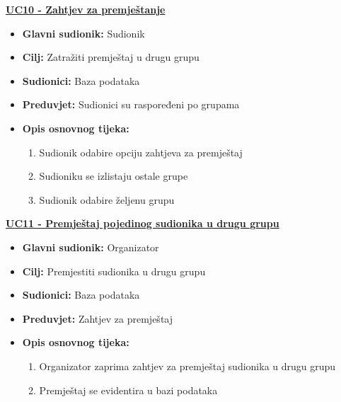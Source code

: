 \noindent \underline{\textbf{UC10 - Zahtjev za premještanje}}
\begin{itemize}
	\item \textbf{Glavni sudionik:} Sudionik
	\item \textbf{Cilj:} Zatražiti premještaj u drugu grupu
	\item \textbf{Sudionici:} Baza podataka
	\item \textbf{Preduvjet:} Sudionici su raspoređeni po grupama
	\item \textbf{Opis osnovnog tijeka:} 
	\begin{enumerate}	
		\item Sudionik odabire opciju zahtjeva za premještaj 
		\item Sudioniku se izlistaju ostale grupe
		\item Sudionik odabire željenu grupu\\
	\end{enumerate}
	
\end{itemize}


\noindent \underline{\textbf{UC11 - Premještaj pojedinog sudionika u drugu grupu}}
\begin{itemize}
	\item \textbf{Glavni sudionik:} Organizator
	\item \textbf{Cilj:} Premjestiti sudionika u drugu grupu
	\item \textbf{Sudionici:} Baza podataka
	\item \textbf{Preduvjet:} Zahtjev za premještaj
	\item \textbf{Opis osnovnog tijeka:} 
	\begin{enumerate}	
		\item Organizator zaprima zahtjev za premještaj sudionika u drugu grupu
		\item Premještaj se evidentira u bazi podataka\\
	\end{enumerate}
	
\end{itemize}


